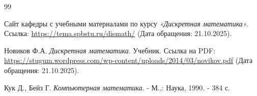 \begin{thebibliography}{99}

 Сайт кафедры с учебными материалами по курсу \textit{«Дискретная математика»}. 
Ссылка: \href{https://tema.spbstu.ru/dismath/}{https://tema.spbstu.ru/dismath/} 
(Дата обращения: 21.10.2025).

 Новиков Ф.А. \textit{Дискретная математика}. Учебник. 
Ссылка на PDF: \href{https://stugum.wordpress.com/wp-content/uploads/2014/03/novikov.pdf}{https://stugum.wordpress.com/wp-content/uploads/2014/03/novikov.pdf} 
(Дата обращения: 21.10.2025).

 Кук Д., Бейз Г. \textit{Компьютерная математика}. - М.,: Наука, 1990. - 384 с.

\end{thebibliography}


